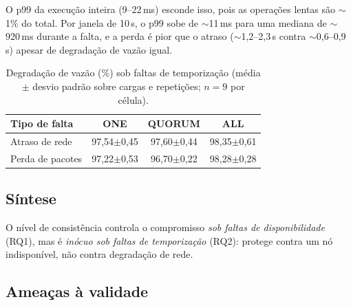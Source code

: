 \documentclass[runningheads]{llncs}
\begin{document}
O p99 da execução inteira (9--22\,ms) esconde isso, pois as operações lentas são
$\sim$1\% do total. Por janela de 10\,s, o p99 sobe de $\sim$11\,ms para uma
mediana de $\sim$920\,ms durante a falta, e a perda é pior que o atraso
($\sim$1,2--2,3\,s contra $\sim$0,6--0,9\,s) apesar de degradação de vazão
igual.

\begin{table}[t]
\centering
\caption{Degradação de vazão (\%) sob faltas de temporização (média $\pm$ desvio
padrão sobre cargas e repetições; $n=9$ por célula).}
\label{tab:performability}
\small
\setlength{\tabcolsep}{5pt}
\begin{tabular}{lccc}
\toprule
\textbf{Tipo de falta} & \textbf{ONE} & \textbf{QUORUM} & \textbf{ALL} \\
\midrule
Atraso de rede   & 97,54$\pm$0,45 & 97,60$\pm$0,44 & 98,35$\pm$0,61 \\
Perda de pacotes & 97,22$\pm$0,53 & 96,70$\pm$0,22 & 98,28$\pm$0,28 \\
\bottomrule
\end{tabular}
\end{table}

\subsection{Síntese}

O nível de consistência controla o compromisso \emph{sob faltas de
disponibilidade} (RQ1), mas é \emph{inócuo sob faltas de temporização} (RQ2):
protege contra um nó indisponível, não contra degradação de rede.

\subsection{Ameaças à validade}
\end{document}
